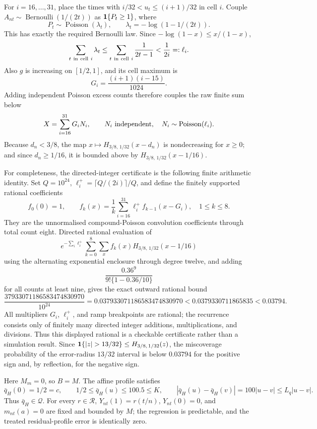 For \(i=16,\ldots,31\), place the times with
\(i/32<u_t\leq(i+1)/32\) in cell \(i\).  Couple
\(A_{nt}\sim\operatorname{Bernoulli}(1/(2t))\) as
\({\bf1}\{P_t\geq1\}\), where
\[
 P_t\sim\operatorname{Poisson}(\lambda_t),\qquad
 \lambda_t=-\log(1-1/(2t)).
\]
This has exactly the required Bernoulli law.  Since
\(-\log(1-x)\leq x/(1-x)\),
\[
 \sum_{t\ {\rm in\ cell}\ i}\lambda_t
 \leq\sum_{t\ {\rm in\ cell}\ i}\frac1{2t-1}
 <\frac1{2i}=:\ell_i.
\]
Also \(g\) is increasing on \([1/2,1]\), and its cell maximum is
\[
 G_i=\frac{(i+1)(i-15)}{1024}.
\]
Adding independent Poisson excess counts therefore couples the raw finite sum below
\[
 X=\sum_{i=16}^{31}G_iN_i,\qquad
 N_i\ \hbox{independent},\quad N_i\sim\operatorname{Poisson}(\ell_i).
\]
Because \(d_n<3/8\), the map
\(x\mapsto H_{3/8,\,1/32}(x-d_n)\) is nondecreasing for \(x\geq0\);
and since \(d_n\geq1/16\), it is bounded above by
\(H_{3/8,\,1/32}(x-1/16)\).

For completeness, the directed-integer certificate is the following finite arithmetic identity.  Set \(Q=10^{24}\),
\(\ell_i^+=\lceil Q/(2i)\rceil/Q\), and define the finitely supported rational coefficients
\[
 f_0(0)=1,\qquad
 f_k(x)=\frac1k\sum_{i=16}^{31}\ell_i^+f_{k-1}(x-G_i),
 \quad 1\leq k\leq8.
\]
They are the unnormalised compound-Poisson convolution coefficients through total count eight.  Directed rational evaluation of
\[
 e^{-\sum_i\ell_i^+}
 \sum_{k=0}^8\sum_x f_k(x)
 H_{3/8,\,1/32}(x-1/16)
\]
using the alternating exponential enclosure through degree twelve, and adding
\[
 \frac{0.36^9}{9!\{1-0.36/10\}}
\]
for all counts at least nine, gives the exact outward rational bound
\[
 \frac{37933071186583474830970}{10^{24}}
 =0.037933071186583474830970
 <0.0379330711865835<0.03794.
\]
All multipliers \(G_i\), \(\ell_i^+\), and ramp breakpoints are rational; the recurrence consists only of finitely many directed integer additions, multiplications, and divisions.  Thus this displayed rational is a checkable certificate rather than a simulation result.  Since
\({\bf1}\{|z|>13/32\}\leq H_{3/8,\,1/32}(z)\), the miscoverage probability of the error-radius \(13/32\) interval is below \(0.03794\) for the positive sign and, by reflection, for the negative sign.

Here \(M_m=0\), so \(B=M\).  The affine profile satisfies
\[
 \bar q_H(0)=1/2=c,\qquad
 1/2\leq\bar q_H(u)\leq100.5\leq K,\qquad
 |\bar q_H(u)-\bar q_H(v)|=100|u-v|\leq L_q|u-v|.
\]
Thus \(\bar q_H\in\mathcal Q\).  For every \(r\in\mathcal R\),
\(Y_{nt}(1)=r(t/n)\), \(Y_{nt}(0)=0\), and \(m_{nt}(a)=0\) are fixed and bounded by \(M\); the regression is predictable, and the treated residual-profile error is identically zero.

